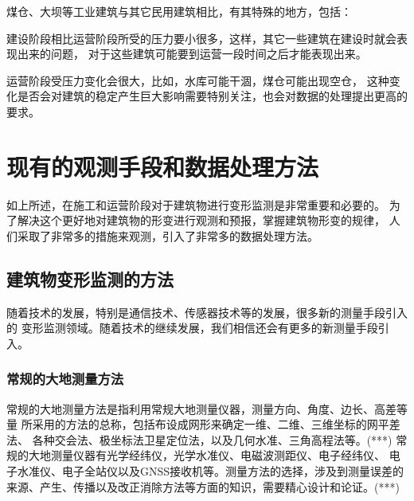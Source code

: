 煤仓、大坝等工业建筑与其它民用建筑相比，有其特殊的地方，包括：
\begin{asparaitem}[$\bullet$]
\item 建设阶段相比运营阶段所受的压力要小很多，这样，其它一些建筑在建设时就会表现出来的问题，
对于这些建筑可能要到运营一段时间之后才能表现出来。
\item 运营阶段受压力变化会很大，比如，水库可能干涸，煤仓可能出现空仓，
这种变化是否会对建筑的稳定产生巨大影响需要特别关注，也会对数据的处理提出更高的要求。
\end{asparaitem}

\section{现有的观测手段和数据处理方法}
如上所述，在施工和运营阶段对于建筑物进行变形监测是非常重要和必要的。
为了解决这个更好地对建筑物的形变进行观测和预报，掌握建筑物形变的规律，
人们采取了非常多的措施来观测，引入了非常多的数据处理方法。

\subsection{建筑物变形监测的方法}
随着技术的发展，特别是通信技术、传感器技术等的发展，很多新的测量手段引入的
变形监测领域。随着技术的继续发展，我们相信还会有更多的新测量手段引入。
\subsubsection{常规的大地测量方法}
常规的大地测量方法是指利用常规大地测量仪器，测量方向、角度、边长、高差等量
所采用的方法的总称，包括布设成网形来确定一维、二维、三维坐标的网平差法、
各种交会法、极坐标法卫星定位法，以及几何水准、三角高程法等。(***)
常规的大地测量仪器有光学经纬仪，光学水准仪、电磁波测距仪、电子经纬仪、
电子水准仪、电子全站仪以及GNSS接收机等。测量方法的选择，涉及到测量误差的
来源、产生、传播以及改正消除方法等方面的知识，需要精心设计和论证。(***)
